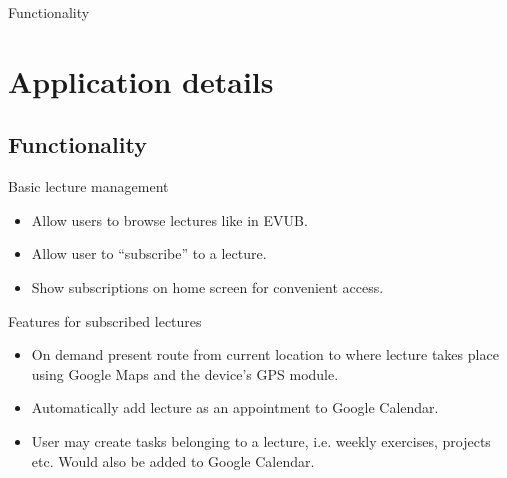 \documentclass{beamer}
\begin{document}
\begin{frame}{Functionality}
	\section{Application details}
	\subsection{Functionality}
	\begin{block}{Basic lecture management}
	\begin{itemize}
		\item Allow users to browse lectures like in EVUB.
		\item Allow user to ``subscribe'' to a lecture.
		\item Show subscriptions on home screen for convenient access.
	\end{itemize}
	\end{block}

	\begin{block}{Features for subscribed lectures}
	\begin{itemize}
		\item On demand present route from current location to where lecture takes place using Google Maps and the device's GPS module.
		\item Automatically add lecture as an appointment to Google Calendar.
		\item User may create tasks belonging to a lecture, i.e. weekly exercises, projects etc. Would also be added to Google Calendar.
	\end{itemize}
	\end{block}
\end{frame}
\end{document}
